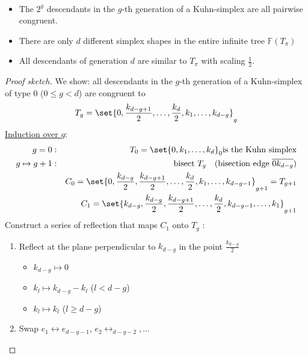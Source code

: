 \begin{theorem}\
	\begin{itemize}
		\item The $2^g$ descendants in the $g$-th generation of a Kuhn-simplex are all pairwise congruent.
		\item There are only $d$ different simplex shapes in the entire infinite tree $\mathbb{F}(T_{\pi})$
		\item All descendants of generation $d$ are similar to $T_{\pi}$ with scaling $\frac{1}{2}$.
			
	\end{itemize}
\end{theorem}
\begin{proof}[Proof sketch]
	We show: all descendants in the $g$-th generation of a Kuhn-simplex of type $0$ ($0 \leq g < d$) are congruent to
	\begin{equation*}
    T_{g}= \set{0, \frac{k_{d-g+1}}{2},\dots ,\frac{k_{d}}{2},k_{1},\dots ,k_{d-g} }_{g}
	\end{equation*}
	\underline{Induction over $g$}:
	\begin{align*}
		g=0&: & T_{0}= \set{0,k_{1},\dots ,k_{d} }_{0} \text{is the Kuhn simplex}\\
		g\mapsto g+1&: &\text{bisect } T_{g}\quad ( \text{bisection edge } \overline{0k_{d-g}})\\
		 && C_{0}= \set{ 0, \frac{k_{d-g}}{2},\frac{k_{d-g+1}}{2},\dots , \frac{k_{d}}{2},k_{1},\dots ,k_{d-g-1}}_{g+1}= T_{g+1}\\
     && C_{1}= \set{ k_{d-g}, \frac{k_{d-g}}{2},\frac{k_{d-g+1}}{2},\dots , \frac{k_{d}}{2},k_{d-g-1},\dots ,k_{1} }_{g+1} %
	\end{align*}
	Construct a series of reflection that maps $C_{1}$ onto $T_{g}$ :
	\begin{enumerate}
		\item Reflect at the plane perpendicular to $k_{d-g}$ in the point $\frac{k_{d-g}}{2}$
			\begin{itemize}
				\item $k_{d-g} \mapsto 0$
				\item $k_{l} \mapsto k_{d-g}-k_{l}$ ($l < d-g$)
				\item $k_{l} \mapsto k_{l}$ ($l \geq d-g$)
			\end{itemize}
		\item Swap $e_{1}\leftrightarrow e_{d-g-1}$, $e_{2} \leftrightarrow_{d-g-2},\dots $

\end{enumerate}
\end{proof}

